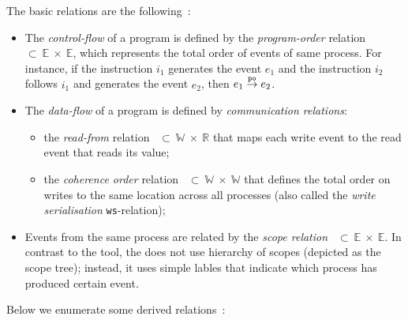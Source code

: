 \vspace{1em}
The basic relations are the following~\cite{alglave2010shared}:
\begin{itemize}
    \item The \textit{control-flow} of a program is defined by the \textit{program-order} relation \po~$\subset~\mathbb{E}~\times~\mathbb{E}$, which represents the total order of events of same process.
	For instance, if the instruction $i_1$ generates the event $e_1$ and the instruction $i_2$ follows $i_1$ and generates the event $e_2$, then $e_1 \overset{\mathtt{po}}{\rightarrow} e_2$.

    \item The \textit{data-flow} of a program is defined by \textit{communication relations}:
        \begin{itemize}[noitemsep]
            \item the \textit{read-from} relation \rf~$\subset~\mathbb{W}~\times~\mathbb{R}$ that maps each write event to the read event that reads its value;
            \item the \textit{coherence order} relation \co~$\subset~\mathbb{W}~\times~\mathbb{W}$ that defines the total order on writes to the same location across all processes (also called the \textit{write serialisation} \texttt{ws}-relation);
        \end{itemize}

	\item Events from the same process are related by the \textit{scope relation} \sr~$\subset~\mathbb{E}~\times~\mathbb{E}$.
    In contrast to the  tool, the \porthos[2] does not use hierarchy of scopes (depicted as the scope tree); instead, it uses simple lables that indicate which process has produced certain event.
\end{itemize}


Below we enumerate some derived relations~\cite{alglave2010shared}:

